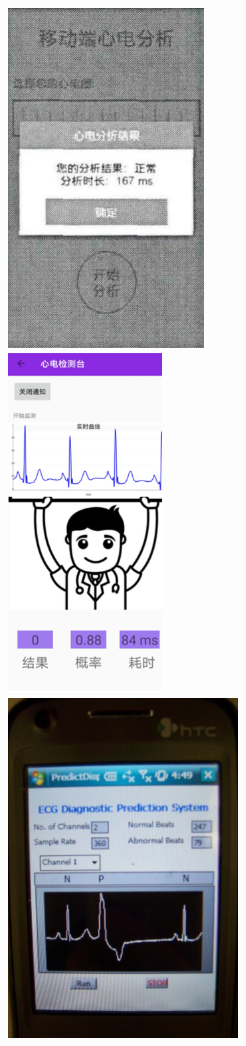 \begin{figure}[h]
    \begin{subcaptionblock}{.332\textwidth}
        \includegraphics[height=9cm]{../assets/demo-0}
    \end{subcaptionblock}
    \begin{subcaptionblock}{.26\textwidth}
        \includegraphics[height=9cm]{../assets/demo-1}
    \end{subcaptionblock}
    \begin{subcaptionblock}{.39\textwidth}
        \includegraphics[height=9cm]{../assets/demo-2}

\end{subcaptionblock}
\end{figure}
